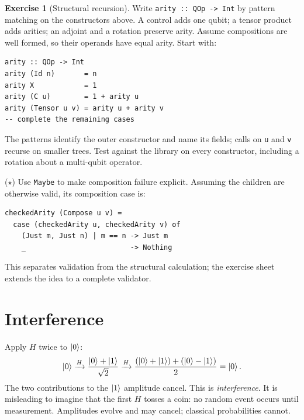 \documentclass[11pt,a4paper]{article}
\theoremstyle{definition}
\newtheorem{exercise}{Exercise}[section]
\begin{document}
\begin{exercise}[Structural recursion]
Write \lstinline|arity :: QOp -> Int| by pattern matching on the constructors
above.  A control adds one qubit; a tensor product adds arities; an adjoint
and a rotation preserve arity.  Assume compositions are well formed, so their
operands have equal arity.
Start with:
\begin{lstlisting}
arity :: QOp -> Int
arity (Id n)       = n
arity X            = 1
arity (C u)        = 1 + arity u
arity (Tensor u v) = arity u + arity v
-- complete the remaining cases
\end{lstlisting}
The patterns identify the outer constructor and name its fields; calls on
\lstinline|u| and \lstinline|v| recurse on smaller trees.  Test against the
library on every constructor, including a rotation about a multi-qubit
operator.

($\star$) Use \lstinline|Maybe| to make composition failure explicit.  Assuming
the children are otherwise valid, its composition case is:
\begin{lstlisting}
checkedArity (Compose u v) =
  case (checkedArity u, checkedArity v) of
    (Just m, Just n) | m == n -> Just m
    _                         -> Nothing
\end{lstlisting}
This separates validation from the structural calculation; the exercise sheet
extends the idea to a complete validator.
\end{exercise}

\section{Interference}
\label{sec:interference}

Apply $H$ twice to $\left| 0 \right\rangle$:
\[
  \left| 0 \right\rangle \xrightarrow{H} \frac{\left| 0 \right\rangle+\left| 1 \right\rangle}{\sqrt2}
  \xrightarrow{H}
  \frac{(\left| 0 \right\rangle+\left| 1 \right\rangle)+(\left| 0 \right\rangle-\left| 1 \right\rangle)}2=\left| 0 \right\rangle.
\]
The two contributions to the $\left| 1 \right\rangle$ amplitude cancel.  This is
\emph{interference}.  It is misleading to imagine that the first $H$ tosses
a coin: no random event occurs until measurement.  Amplitudes evolve and may
cancel; classical probabilities cannot.
\end{document}
